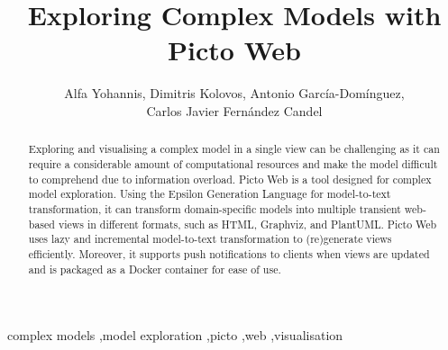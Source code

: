 \documentclass[preprint,12pt, a4paper]{elsarticle}
\begin{document}
\begin{frontmatter}



\title{Exploring Complex Models with Picto Web}


\author{Alfa Yohannis, Dimitris Kolovos, Antonio García-Domínguez,\\
  Carlos Javier Fernández Candel}

\address{University of York, United Kingdom}

\begin{abstract}
Exploring and visualising a complex model in a single view can be challenging as it can require a considerable amount of computational resources and make the model difficult to comprehend due to information overload.
Picto Web is a tool designed for complex model exploration. Using the Epsilon Generation Language for model-to-text transformation, it can transform domain-specific models into multiple transient web-based views in different formats, such as HTML, Graphviz, and PlantUML. 
Picto Web uses lazy and incremental model-to-text transformation to (re)generate views efficiently. 
Moreover, it supports push notifications to clients when views are updated and is packaged as a Docker container for ease of use.
\end{abstract}

\begin{keyword}
complex models \sep model exploration \sep picto \sep web \sep visualisation
\end{keyword}

\end{frontmatter}
\end{document}
